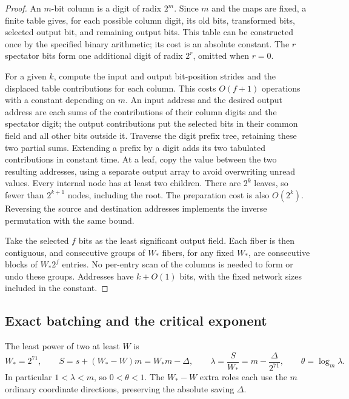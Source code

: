 \begin{proof}
An $m$-bit column is a digit of radix $2^m$.  Since $m$ and the
maps are fixed, a finite table gives, for each possible column
digit, its old bits, transformed bits, selected output bit, and
remaining output bits.  This table can be constructed once by
the specified binary arithmetic; its cost is an absolute constant.
The $r$ spectator bits form one additional digit of radix $2^r$,
omitted when $r=0$.

For a given $k$, compute the input and output bit-position strides
and the displaced table contributions for each column.  This
costs $O(f+1)$ operations with a constant depending on $m$.
An input address and the desired output address are each sums
of the contributions of their column digits and the spectator
digit; the output contributions put the selected bits in their
common field and all other bits outside it.  Traverse the digit
prefix tree, retaining these two partial sums.  Extending a prefix
by a digit adds its two tabulated contributions in constant time.
At a leaf, copy the value between the two resulting addresses,
using a separate output array to avoid overwriting unread values.
Every internal node has at least two children.  There are $2^k$
leaves, so fewer than $2^{k+1}$ nodes, including the root.
The preparation cost is also $O(2^k)$.  Reversing the source and
destination addresses implements the inverse permutation with
the same bound.

Take the selected $f$ bits as the least significant output field.
Each fiber is then contiguous, and consecutive groups of $W_*$
fibers, for any fixed $W_*$, are consecutive blocks of
$W_*2^f$ entries.  No per-entry scan of the columns is needed
to form or undo these groups.  Addresses have $k+O(1)$ bits,
with the fixed network sizes included in the constant.
\end{proof}

\subsection{Exact batching and the critical exponent}

The least power of two at least $W$ is
\begin{equation}\label{net:padding}
 W_*=2^{71},\qquad
 S=s+(W_*-W)m=W_*m-\Delta,\qquad
 \lambda=\frac{S}{W_*}=m-\frac{\Delta}{2^{71}},\qquad
 \theta=\log_m\lambda.
\end{equation}
In particular $1<\lambda<m$, so $0<\theta<1$.
The $W_*-W$ extra roles each use the $m$ ordinary coordinate
directions, preserving the absolute saving $\Delta$.

